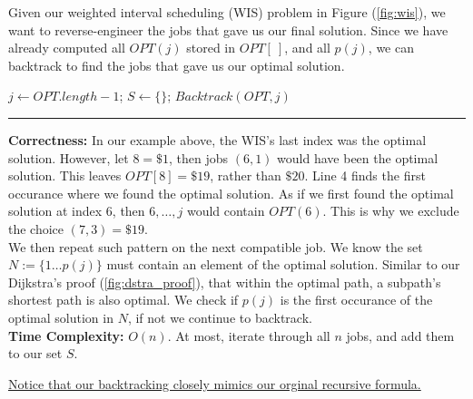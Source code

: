\noindent
Given our weighted interval scheduling (WIS) problem in Figure (\ref{fig:wis}), we want to reverse-engineer the jobs that gave us
our final solution. Since we have already computed all $OPT(j)$ stored in $OPT[\ ]$, and all $p(j)$, we can backtrack
to find the jobs that gave us our optimal solution.

\begin{Func}
    \label{func:backtrack}
    \vspace{-.5em}
    \begin{algorithm}[H]
        \SetAlgoLined
        $j \gets OPT.length-1$; $S \gets \{\}$; 
        $Backtrack(OPT, j)$\;
    \end{algorithm}
    \noindent
    \rule{\textwidth}{0.4pt}
    \textbf{Correctness:} In our example above, the WIS's last index was the optimal solution. However, let $8=\$1$, then
    jobs $(6,1)$ would have been the optimal solution. This leaves $OPT[8]=\$19$, rather than $\$20$. Line 4 finds the first occurance where
    we found the optimal solution. As if we first found the optimal solution at index $6$, then $6,\dots,j$ would contain $OPT(6)$. This is why
    we exclude the choice $(7,3)=\$19$.\\

    \noindent
    We then repeat such pattern on the next compatible job. We know the set $N:=\{1\dots p(j)\}$ must contain an element of the optimal solution.
    Similar to our Dijkstra's proof (\ref{fig:dstra_proof}), that within the optimal path, a subpath's shortest path is also optimal. We check if
    $p(j)$ is the first occurance of the optimal solution in $N$, if not we continue to backtrack.\\

    \noindent
    \textbf{Time Complexity:} $O(n)$. At most, iterate through all $n$ jobs, and add them to our set $S$.
\end{Func}
\noindent
\underline{Notice that our backtracking closely mimics our orginal recursive formula.}


